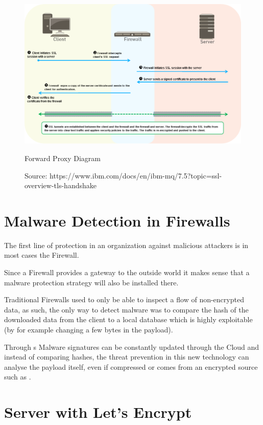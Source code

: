 \begin{figure}[!hb]
 \centering
 \includegraphics[width=13cm]{img/ssl_decryption_diagram.png}
 \caption{ Forward Proxy Diagram}
 \caption*{Source: https://www.ibm.com/docs/en/ibm-mq/7.5?topic=ssl-overview-tls-handshake}
 \label{SSL Forward Diagram}
\end{figure}

\newpage

\section{Malware Detection in Firewalls}

The first line of protection in an organization against malicious attackers is in most cases the Firewall.

Since a Firewall provides a gateway to the outside world it makes sense that a malware protection strategy will also be installed there.

Traditional Firewalls used to only be able to inspect a flow of non-encrypted data, as such, the only way to detect malware was to compare the hash of the downloaded data from the client to a local database which is highly exploitable (by for example changing a few bytes in the payload).

Through s Malware signatures can be constantly updated through the Cloud and instead of comparing hashes, the threat prevention in this new technology can analyse the payload itself, even if compressed or comes from an encrypted source such as .

\section{ Server with Let's Encrypt}

